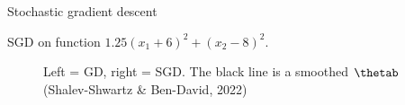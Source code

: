 \begin{vbframe}{Stochastic gradient descent}
  \framebreak

 
 SGD on function $1.25(x_1 + 6)^2 + (x_2 - 8)^2$.
 \begin{figure}
 \begin{center}
 \caption{Left = GD, right = SGD. The black line is a smoothed $\thetab$ (Shalev-Shwartz \& Ben-David, 2022)}
 \end{center}
 \end{figure}

  \end{vbframe}
  


